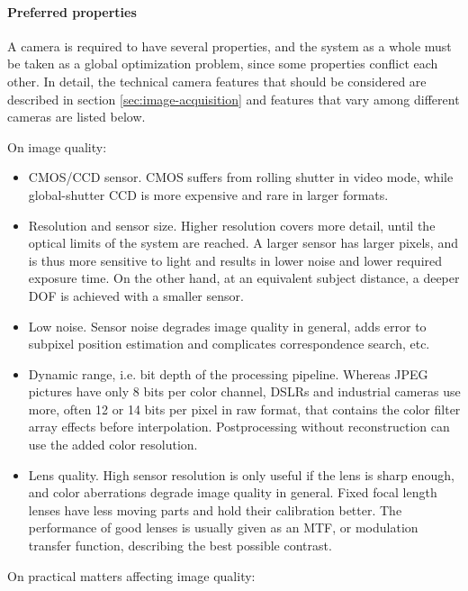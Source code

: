 \paragraph{Preferred properties}
A camera is required to have several properties, and the system as a whole must be taken as a global optimization problem, since some properties conflict each other.
In detail, the technical camera features that should be considered are described in section \ref{sec:image-acquisition} and features that vary among different cameras are listed below.

On image quality:

\begin{itemize}
	\item CMOS/CCD sensor. CMOS suffers from rolling shutter in video mode, while global-shutter CCD is more expensive and rare in larger formats.

	\item Resolution and sensor size. Higher resolution covers more detail, until the optical limits of the system are reached. A larger sensor has larger pixels, and is thus more sensitive to light and results in lower noise and lower required exposure time. On the other hand, at an equivalent subject distance, a deeper DOF is achieved with a smaller sensor.

	\item Low noise. Sensor noise degrades image quality in general, adds error to subpixel position estimation and complicates correspondence search, etc.

	\item Dynamic range, i.e. bit depth of the processing pipeline. Whereas JPEG pictures have only 8 bits per color channel, DSLRs and industrial cameras use more, often 12 or 14 bits per pixel in raw format, that contains the color filter array effects before interpolation. Postprocessing without reconstruction can use the added color resolution.

	\item Lens quality. High sensor resolution is only useful if the lens is sharp enough, and color aberrations degrade image quality in general. Fixed focal length lenses have less moving parts and hold their calibration better. The performance of good lenses is usually given as an MTF, or modulation transfer function, describing the best possible contrast.
\end{itemize}

On practical matters affecting image quality:

